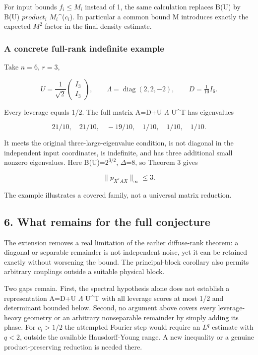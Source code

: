 \documentclass[
  11pt,
]{article}
\begin{document}
For input bounds \(f_i\le M_i\) instead of 1, the same calculation
replaces B(U) by B(U) \(product_i\) \(M_i\)\^{}(\(c_i\)). In particular
a common bound M introduces exactly the expected \(M^2\) factor in the
final density estimate.

\subsubsection{A concrete full-rank indefinite
example}\label{a-concrete-full-rank-indefinite-example}

Take \(n=6\), \(r=3\),

\[
U=\frac1{\sqrt2}\begin{pmatrix}I_3\\I_3\end{pmatrix},\qquad
\Lambda=\operatorname{diag}(2,2,-2),\qquad D=\tfrac1{10}I_6.
\]

Every leverage equals 1/2. The full matrix A=D+U \(\Lambda\) U\^{}T has
eigenvalues

\[
21/10,\quad21/10,\quad-19/10,\quad1/10,\quad1/10,\quad1/10.
\]

It meets the original three-large-eigenvalue condition, is not diagonal
in the independent input coordinates, is indefinite, and has three
additional small nonzero eigenvalues. Here B(U)=\(2^{3/2}\),
\(\Delta\)=8, so Theorem 3 gives

\[
\lVert p_{X^TAX}\rVert_\infty\le3.
\]

The example illustrates a covered family, not a universal matrix
reduction.

\subsection{6. What remains for the full
conjecture}\label{what-remains-for-the-full-conjecture}

The extension removes a real limitation of the earlier diffuse-rank
theorem: a diagonal or separable remainder is not independent noise, yet
it can be retained exactly without worsening the bound. The
principal-block corollary also permits arbitrary couplings outside a
suitable physical block.

Two gaps remain. First, the spectral hypothesis alone does not establish
a representation A=D+U \(\Lambda\) U\^{}T with all leverage scores at
most 1/2 and determinant bounded below. Second, no argument above covers
every leverage-heavy geometry or an arbitrary nonseparable remainder by
simply adding its phase. For \(c_i>1/2\) the attempted Fourier step
would require an \(L^q\) estimate with \(q<2\), outside the available
Hausdorff-Young range. A new inequality or a genuine product-preserving
reduction is needed there.
\end{document}
